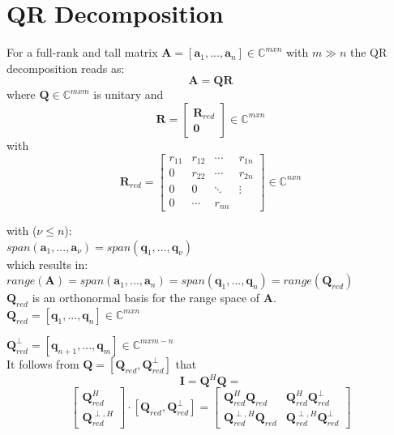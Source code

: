 \documentclass[english]{latex4ei/latex4ei_sheet}
\begin{document}
\section{QR Decomposition}
\begin{sectionbox}
    For a full-rank and tall matrix $\mathbf{A} = [\mathbf{a}_1, ...,\mathbf{a}_n] \in \mathbb{C}^{mxn}$ with $m\gg n$ the QR decomposition reads as:
    $$\mathbf{A} = \mathbf{Q}\mathbf{R}$$
    where $\mathbf{Q}\in\mathbb{C}^{mxm}$ is unitary and
    $$\mathbf{R}=\begin{bmatrix}
            \mathbf{R}_{red} \\
            \mathbf{0}
        \end{bmatrix} \in \mathbb{C}^{mxn}$$
    with
    $$\mathbf{R}_{red} = \begin{bmatrix}
            r_{11} & r_{12} & \cdots & r_{1n} \\
            0      & r_{22} & \cdots & r_{2n} \\
            0      & 0      & \ddots & \vdots \\
            0      & \cdots & r_{nn}
        \end{bmatrix} \in \mathbb{C}^{nxn}$$

    with ($\nu \leq n$):\\
    $span(\mathbf{a}_1, ...,\mathbf{a}_\nu) = span(\mathbf{q}_1, ...,\mathbf{q}_\nu)$\\
    which results in:\\
    $range(\mathbf{A}) = span(\mathbf{a}_1, ...,\mathbf{a}_n) = span(\mathbf{q}_1, ...,\mathbf{q}_n) = range(\mathbf{Q}_{red})$\\
    $\mathbf{Q}_{red}$ is an orthonormal basis for the range space of $\mathbf{A}$. \\

    $\mathbf{Q}_{red} = [\mathbf{q}_1, ...,\mathbf{q}_n]\in \mathbb{C}^{mxn}$

    $\mathbf{Q}^\perp_{red} = [\mathbf{q}_{n+1}, ... ,\mathbf{q}_m] \in \mathbb{C}^{mxm-n}$\\
    It follows from
    $\mathbf{Q} = [\mathbf{Q}_{red},\mathbf{Q}_{red}^\perp]$ that\\
    $$\mathbf{I} = \mathbf{Q}^H\mathbf{Q} = $$
    $$\begin{bmatrix}
            \mathbf{Q}_{red}^H \\
            \mathbf{Q}_{red}^{\perp,H}
        \end{bmatrix} \cdot [\mathbf{Q}_{red}, \mathbf{Q}_{red}^\perp] = \begin{bmatrix}
            \mathbf{Q}_{red}^H\mathbf{Q}_{red}         & \mathbf{Q}_{red}^H\mathbf{Q}_{red}^\perp         \\
            \mathbf{Q}_{red}^{\perp,H}\mathbf{Q}_{red} & \mathbf{Q}_{red}^{\perp,H}\mathbf{Q}_{red}^\perp
        \end{bmatrix}$$\\


\end{sectionbox}
\end{document}
